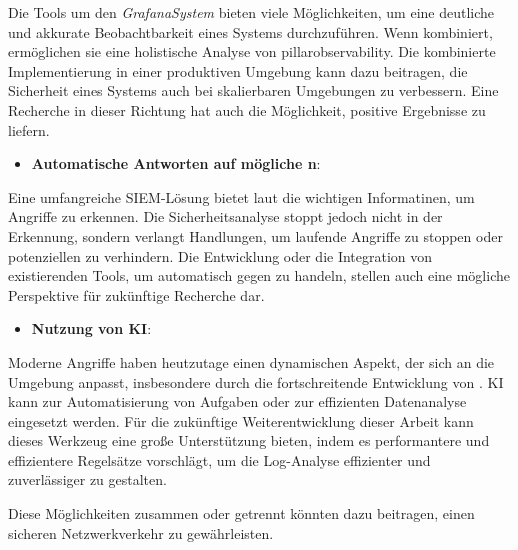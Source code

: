 Die Tools um den \textit{\gls{GrafanaSystem}} bieten viele Möglichkeiten, um eine deutliche und akkurate Beobachtbarkeit eines Systems durchzuführen. Wenn kombiniert, ermöglichen sie eine holistische Analyse von \gls{pillarobservability}. Die kombinierte Implementierung in einer produktiven Umgebung kann dazu beitragen, die Sicherheit eines Systems auch bei skalierbaren Umgebungen zu verbessern. Eine Recherche in dieser Richtung hat auch die Möglichkeit, positive Ergebnisse zu liefern.


\begin{itemize}[noitemsep]
    \item \textbf{Automatische Antworten auf mögliche n}:
\end{itemize}

Eine umfangreiche \gls{SIEM}-Lösung bietet laut \cite{Mohammed_NOC} die wichtigen Informatinen, um Angriffe zu erkennen. Die Sicherheitsanalyse stoppt jedoch nicht in der Erkennung, sondern verlangt Handlungen, um laufende Angriffe zu stoppen oder potenziellen zu verhindern. Die Entwicklung oder die Integration von existierenden Tools, um automatisch gegen  zu handeln, stellen auch eine mögliche Perspektive für zukünftige Recherche dar.

\begin{itemize}[noitemsep]
    \item \textbf{Nutzung von \gls{KI}}:
\end{itemize}

Moderne Angriffe haben heutzutage einen dynamischen Aspekt, der sich an die Umgebung anpasst, insbesondere durch die fortschreitende Entwicklung von  \citep{Guembe_AIHACKER}. \gls{KI} kann zur Automatisierung von Aufgaben oder zur effizienten Datenanalyse eingesetzt werden. Für die zukünftige Weiterentwicklung dieser Arbeit kann dieses Werkzeug eine große Unterstützung bieten, indem es performantere und effizientere Regelsätze vorschlägt, um die Log-Analyse effizienter und zuverlässiger zu gestalten. 

Diese Möglichkeiten zusammen oder getrennt könnten dazu beitragen, einen sicheren Netzwerkverkehr zu gewährleisten.